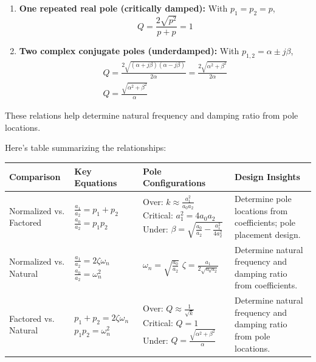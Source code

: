 \begin{enumerate}
\begin{enumerate}
        For large k:
        \[ Q \approx \frac{1}{\sqrt{k}} \]
      \item \textbf{One repeated real pole (critically damped):} With \( p_1 = p_2 = p \),
        \[ Q = \frac{2\sqrt{p^2}}{p + p} = 1 \]
      \item \textbf{Two complex conjugate poles (underdamped):} With \( p_{1,2} = \alpha \pm j\beta \),
        \begin{align*}
           Q = \frac{2\sqrt{(\alpha + j\beta)(\alpha - j\beta)}}{2\alpha}
           = \frac{2\sqrt{\alpha^2 + \beta^2}}{2\alpha} \\
            Q = \frac{\sqrt{\alpha^2 + \beta^2}}{\alpha}
         \end{align*}
    \end{enumerate}
    These relations help determine natural frequency and
    damping ratio from pole locations.
\end{enumerate}
Here's  table summarizing the relationships:
\begin{center}
  \begin{tabularx}{\linewidth}{|X|X|X|X|} \hline
    \textbf{Comparison} & \textbf{Key Equations} & \textbf{Pole Configurations} & \textbf{Design Insights} \\ \hline
    Normalized vs. Factored & \(\frac{a_1}{a_2} = p_1 + p_2\) \newline \(\frac{a_0}{a_2} = p_1 p_2\) & Over: \(k \approx \frac{a_1^2}{a_0 a_2}\) \newline Critical: \(a_1^2 = 4 a_0 a_2\) \newline Under: \(\beta = \sqrt{\frac{a_0}{a_2} - \frac{a_1^2}{4a_2^2}}\) & Determine pole locations from coefficients; pole placement design. \\ \hline
    Normalized vs. Natural & \(\frac{a_1}{a_2} = 2\zeta\omega_n\) \newline \(\frac{a_0}{a_2} = \omega_n^2\) & \(\omega_n = \sqrt{\frac{a_0}{a_2}}\) \newline \(\zeta = \frac{a_1}{2\sqrt{a_0 a_2}}\) & Determine natural frequency and damping ratio from coefficients. \\ \hline
    Factored vs. Natural & \(p_1 + p_2 = 2\zeta\omega_n\) \newline \(p_1 p_2 = \omega_n^2\) & Over: \(Q \approx \frac{1}{\sqrt{k}}\) \newline Critical: \(Q = 1\) \newline Under: \(Q = \frac{\sqrt{\alpha^2 + \beta^2}}{\alpha}\) & Determine natural frequency and damping ratio from pole locations. \\ \hline
  \end{tabularx}
\end{center}

